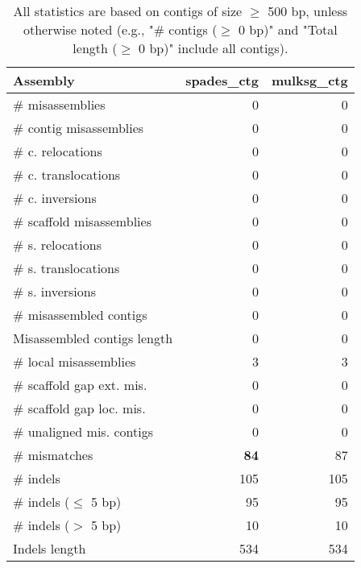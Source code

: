\documentclass[12pt,a4paper]{article}
\begin{document}
\begin{table}[ht]
\begin{center}
\caption{All statistics are based on contigs of size $\geq$ 500 bp, unless otherwise noted (e.g., "\# contigs ($\geq$ 0 bp)" and "Total length ($\geq$ 0 bp)" include all contigs).}
\begin{tabular}{|l*{2}{|r}|}
\hline
Assembly & spades\_ctg & mulksg\_ctg \\ \hline
\# misassemblies & 0 & 0 \\ \hline
\hspace{2mm}\# contig misassemblies & 0 & 0 \\ \hline
\hspace{5mm}\# c. relocations & 0 & 0 \\ \hline
\hspace{5mm}\# c. translocations & 0 & 0 \\ \hline
\hspace{5mm}\# c. inversions & 0 & 0 \\ \hline
\hspace{2mm}\# scaffold misassemblies & 0 & 0 \\ \hline
\hspace{5mm}\# s. relocations & 0 & 0 \\ \hline
\hspace{5mm}\# s. translocations & 0 & 0 \\ \hline
\hspace{5mm}\# s. inversions & 0 & 0 \\ \hline
\# misassembled contigs & 0 & 0 \\ \hline
Misassembled contigs length & 0 & 0 \\ \hline
\# local misassemblies & 3 & 3 \\ \hline
\# scaffold gap ext. mis. & 0 & 0 \\ \hline
\# scaffold gap loc. mis. & 0 & 0 \\ \hline
\# unaligned mis. contigs & 0 & 0 \\ \hline
\# mismatches & {\bf 84} & 87 \\ \hline
\# indels & 105 & 105 \\ \hline
\hspace{5mm}\# indels ($\leq$ 5 bp) & 95 & 95 \\ \hline
\hspace{5mm}\# indels ($>$ 5 bp) & 10 & 10 \\ \hline
Indels length & 534 & 534 \\ \hline
\end{tabular}
\end{center}
\end{table}
\end{document}
